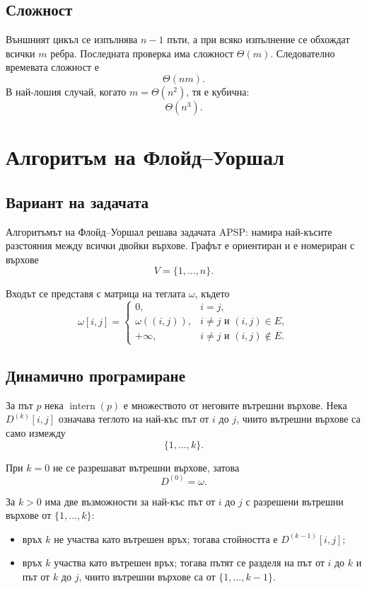 \subsection{Сложност}\label{s:8.5.4}

Външният цикъл се изпълнява $n-1$ пъти, а при всяко изпълнение се обхождат всички $m$ ребра. Последната проверка има сложност $\Theta(m)$. Следователно времевата сложност е
\[
\Theta(nm).
\]
В най-лошия случай, когато $m=\Theta(n^2)$, тя е кубична:
\[
\Theta(n^3).
\]

\section{Алгоритъм на Флойд--Уоршал}\label{s:8.6}

\subsection{Вариант на задачата}\label{s:8.6.1}

Алгоритъмът на Флойд--Уоршал решава задачата APSP: намира най-късите разстояния между всички двойки върхове. Графът е ориентиран и е номериран с върхове
\[
V=\{1,\ldots,n\}.
\]

Входът се представя с матрица на теглата $\omega$, където
\[
\omega[i,j]=
\begin{cases}
0, & i=j,\\
\omega((i,j)), & i\ne j \text{ и }(i,j)\in E,\\
+\infty, & i\ne j \text{ и }(i,j)\notin E.
\end{cases}
\]

\subsection{Динамично програмиране}\label{s:8.6.2}

За път $p$ нека $\operatorname{intern}(p)$ е множеството от неговите вътрешни върхове. Нека $D^{(k)}[i,j]$ означава теглото на най-къс път от $i$ до $j$, чиито вътрешни върхове са само измежду
\[
\{1,\ldots,k\}.
\]

При $k=0$ не се разрешават вътрешни върхове, затова
\[
D^{(0)}=\omega.
\]

За $k>0$ има две възможности за най-къс път от $i$ до $j$ с разрешени вътрешни върхове от $\{1,\ldots,k\}$:

\begin{itemize}
\item връх $k$ не участва като вътрешен връх; тогава стойността е $D^{(k-1)}[i,j]$;
\item връх $k$ участва като вътрешен връх; тогава пътят се разделя на път от $i$ до $k$ и път от $k$ до $j$, чиито вътрешни върхове са от $\{1,\ldots,k-1\}$.
\end{itemize}

